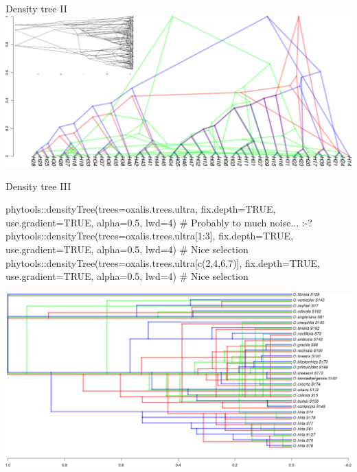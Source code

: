 \documentclass[compress, ucs, xelatex, 11pt, xcolor=svgnames,
  hyperref={
    bookmarks=true,
    unicode=true,
    colorlinks=true,
    pdftitle={Molecular data in R},
    plainpages=false,
    pdfauthor={Vojtech Zeisek},
    pdfsubject={Course about phylogeny and evolution in R},
    pdfcreator={XeLaTeX},
    pdfkeywords={R, evolution, phylogeny, molecular data},
    linkcolor=Tomato,
    anchorcolor=SaddleBrown,
    citecolor=Goldenrod,
    filecolor=DarkMagenta,
    menucolor=Sienna,
    urlcolor=DarkTurquoise,
    pdftex},
  url={hyphens, lowtilde} %
  ]{beamer}
\begin{document}
\begin{frame}[fragile]{Density tree II}
  \includegraphics[width=\textwidth]{oxalis_density_phangorn.png}
\end{frame}

\begin{frame}[fragile]{Density tree III}
  \begin{spluscode}
    phytools::densityTree(trees=oxalis.trees.ultra, fix.depth=TRUE,
      use.gradient=TRUE, alpha=0.5, lwd=4) # Probably to much noise... :-?
    phytools::densityTree(trees=oxalis.trees.ultra[1:3], fix.depth=TRUE,
      use.gradient=TRUE, alpha=0.5, lwd=4) # Nice selection
    phytools::densityTree(trees=oxalis.trees.ultra[c(2,4,6,7)],
      fix.depth=TRUE, use.gradient=TRUE, alpha=0.5, lwd=4) # Nice selection
  \end{spluscode}
  \begin{center}
    \includegraphics[width=\textwidth-2.75cm]{oxalis_density_phytools.png}
  \end{center}
\end{frame}

% 
\end{document}
